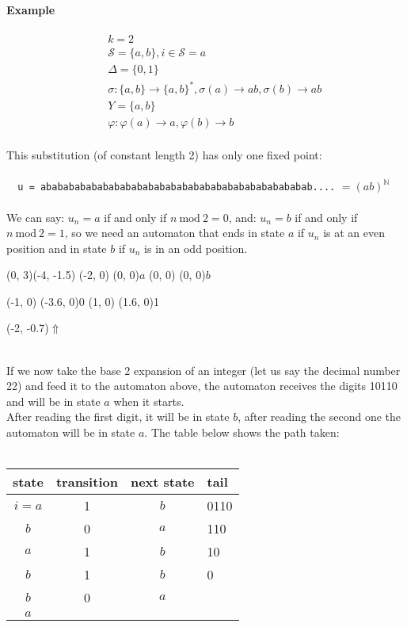 \documentclass{article}
\begin{document}
\paragraph{Example}
\begin{eqnarray*}
&&k = 2\\
&&\mathcal{S} = \{a, b\}, i \in \mathcal{S} = a\\
&&\Delta = \{0, 1\}\\
&&\sigma:\{a, b\} \rightarrow \{a, b\}^*, \sigma(a) \rightarrow ab,
\sigma(b) \rightarrow ab\\
&&Y = \{a, b\}\\
&&\varphi: \varphi(a) \rightarrow a, \varphi(b) \rightarrow b
\end{eqnarray*}
\\
This substitution (of constant length 2) has only one fixed point:\\
\\
\verb#  u = abababababababababababababababababababababababab....#
$= (ab)^\mathbb{N}$\\
\\
We can say: $u_n = a$ if and only if $n \mathrm{\ mod\ } 2 = 0$, and:
$u_n = b$ if and only if $n \mathrm{\ mod\ } 2 = 1$, so we need an automaton
that ends in state $a$ if $u_n$ is at an even position and in state $b$ if
$u_n$ is in an odd position.\\
\begin{graph}(0, 3)(-4, -1.5)
  (-2, 0) (0, 0){$a$}
  (0, 0)  (0, 0){$b$}

  (-1, 0) \freetext(-3.6, 0){0}
   
   
  (1, 0) \freetext(1.6, 0){1}

  \freetext(-2, -0.7){$\Uparrow$}
\end{graph}\\
If we now take the base 2 expansion of an integer (let us say the decimal
number 22) and feed it to the automaton above, the automaton receives the
digits 10110 and will be in state $a$ when it starts.\\
After reading the first digit, it will be in state $b$, after reading the
second one the automaton will be in state $a$. The table below shows the path
taken:\\
\\
\begin{tabular}{c|c|c|l}
state & transition & next state & tail\\
\hline
$i=a$ & 1 & $b$ & 0110\\
$b$   & 0 & $a$ & 110\\
$a$   & 1 & $b$ & 10\\
$b$   & 1 & $b$ & 0\\
$b$   & 0 & $a$ &\\
$a$   &   &   &
\end{tabular}\\
\end{document}
